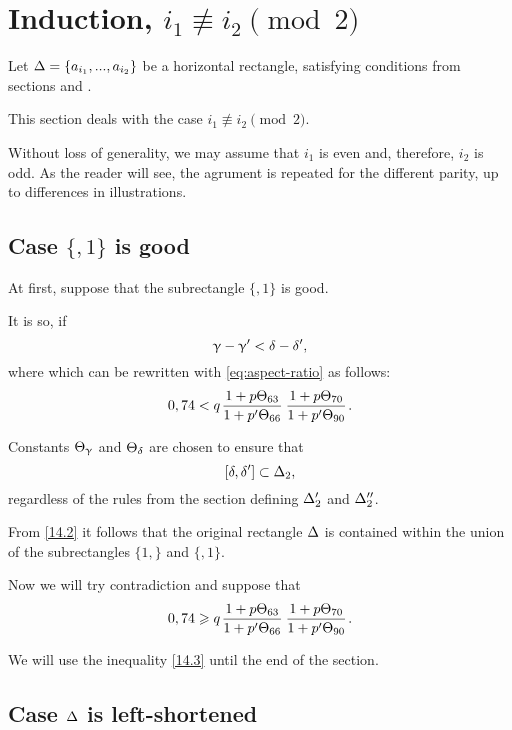 \section{Induction, $i_1 \not\equiv i_2 \pmod 2$}

Let $\Delta = \{ a_{i_1}, ..., a_{i_2}\}$ be a horizontal rectangle,
satisfying conditions from sections  and .

This section deals with the case $i_1 \not\equiv i_2 \pmod 2$.

Without loss of generality, we may assume that $i_1$ is even and, therefore, $i_2$ is odd.
As the reader will see, the agrument is repeated for the different parity,
up to differences in illustrations.

\subsection{Case $\{, 1\}$ is good}

At first, suppose that the subrectangle $\{,1\}$ is good.

It is so, if
\begin{equation*}
	\upgamma - \upgamma' < \delta - \delta',
\end{equation*}
where
which can be rewritten with \ref{eq:aspect-ratio} as follows:
\begin{equation}\label{14.2}
	0,74 < q \up{63}{66} \up{70}{90}.
\end{equation}

Constants $\Theta_{\upgamma}$ and $\Theta_{\delta}$ are chosen to ensure that
\begin{equation*}
	\left[ \delta, \delta' \right] \subset \Delta_2,
\end{equation*}
regardless of the rules from the section  defining $\Delta_2'$ and $\Delta_2''$.

From \ref{14.2} it follows that the original rectangle $\Delta$ is contained
within the union of the subrectangles $\{1,\}$ and $\{,1\}$.


Now we will try contradiction and suppose that
\begin{equation}\label{14.3}
	0,74 \geqslant q \up{63}{66} \up{70}{90}.
\end{equation}

We will use the inequality \ref{14.3} until the end of the section.


\subsection{Case $\Delta$ is left-shortened}

